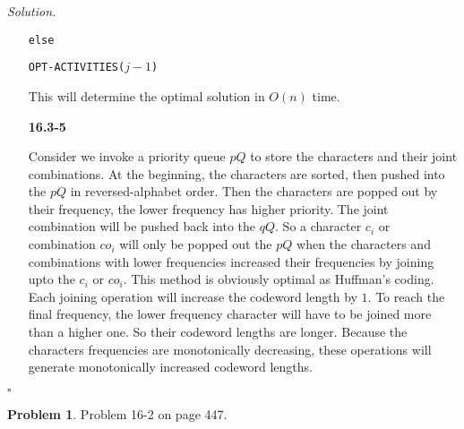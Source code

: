 \documentclass[11pt]{article}
\theoremstyle{definition}
\newtheorem{problem}{Problem}
\newenvironment{solution}{\noindent\emph{Solution.}}{\hfill$\square$}
\newcommand\tab[1][1cm]{\hspace*{#1}}
\begin{document}
\begin{solution}
\begin{enumerate}
    \tab \texttt{else}
    
    \tab\tab \texttt{OPT-ACTIVITIES($j - 1$)}
    
    This will determine the optimal solution in $O(n)$ time.
    
    \item[\textbf{16.3-5}]
    
    Consider we invoke a priority queue $pQ$ to store the characters and their joint combinations. At the beginning, the characters are sorted, then pushed into the $pQ$ in reversed-alphabet order. Then the characters are popped out by their frequency, the lower frequency has higher priority. The joint combination will be pushed back into the $qQ$. So a character $c_i$ or combination $co_i$ will only be popped out the $pQ$ when the characters and combinations with lower frequencies increased their frequencies by joining upto the $c_i$ or $co_i$. This method is obviously optimal as Huffman’s coding. Each joining operation will increase the codeword length by $1$. To reach the final frequency, the lower frequency character will have to be joined more than a higher one. So their codeword lengths are longer. Because the characters frequencies are monotonically decreasing, these operations will generate monotonically increased codeword lengths.
    		


\end{enumerate}



\end{solution}


\newpage



\begin{problem}
Problem 16-2 on page 447.
\end{problem}
\end{document}
